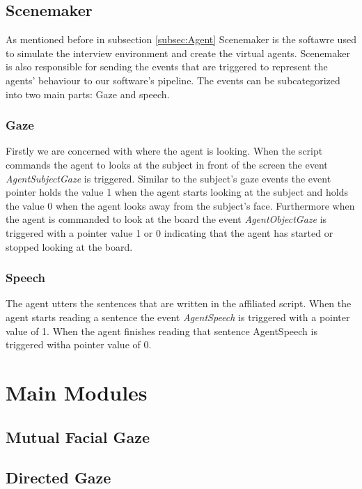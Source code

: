 \documentclass[12pt, a4paper, fleqn]{memoir}%
\begin{document}
\section{Scenemaker}
\label{sec:Scenemaker}
As mentioned before in subsection \ref{subsec:Agent} Scenemaker is the softawre used to simulate the interview environment and create the virtual agents. Scenemaker is also responsible for sending the events that are triggered to represent the agents' behaviour to our software's pipeline. The events can be subcategorized into two main parts: Gaze and speech.

\subsection{Gaze}
Firstly we are concerned with where the agent is looking. When the script commands the agent to looks at the subject in front of the screen the event \textit{AgentSubjectGaze} is triggered. Similar to the subject's gaze events the event pointer holds the value 1 when the agent starts looking at the subject and holds the value 0 when the agent looks away from the subject's face.
Furthermore when the agent is commanded to look at the board the event \textit{AgentObjectGaze} is triggered with a pointer value 1 or 0 indicating that the agent has started or stopped looking at the board.

\subsection{Speech}
The agent utters the sentences that are written in the affiliated script. When the agent starts reading a sentence the event \textit{AgentSpeech} is triggered with a pointer value of 1. When the agent finishes reading that sentence AgentSpeech is triggered witha pointer value of 0.

\chapter{Main Modules}
\label{chap:MainModules}

\section{Mutual Facial Gaze}
\label{sec:MutualFacialGaze}

\section{Directed Gaze}
\label{sec:DirectedGaze}
\end{document}
